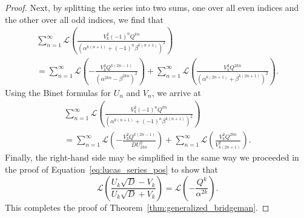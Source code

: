 \documentclass[10pt,a4paper]{amsart}
\begin{document}
\begin{proof}
    Next, by splitting the series into two sums, one over all even indices and the other over all odd indices, we find that
    \begin{multline*}
        \sum_{n=1}^{\infty}\mathcal{L}\left(\frac{V^2_k (-1)^n Q^{kn}}{\left(\alpha^{k(n+1)}+(-1)^{n}\beta^{k(n+1)}\right)^2 }\right) \\ = \sum_{n=1}^{\infty}\mathcal{L}\left(-\frac{V^2_k Q^{k(2n-1)}}{\left(\alpha^{2kn}-\beta^{2kn}\right)^2 }\right) + \sum_{n=1}^{\infty}\mathcal{L}\left(\frac{V^2_k Q^{2kn}}{\left(\alpha^{k(2n+1)}+\beta^{k(2n+1)}\right)^2 }\right).
    \end{multline*}
    Using the Binet formulas for $U_n$ and $V_n$, we arrive at
        \begin{multline*}
        \sum_{n=1}^{\infty}\mathcal{L}\left(\frac{V^2_k (-1)^n Q^{kn}}{\left(\alpha^{k(n+1)}+(-1)^{n}\beta^{k(n+1)}\right)^2 }\right) \\ = \sum_{n=1}^{\infty}\mathcal{L}\left(-\frac{V^2_k Q^{k(2n-1)}}{D U^2_{2kn} }\right) + \sum_{n=1}^{\infty}\mathcal{L}\left(\frac{V^2_k Q^{2kn}}{ V^2_{k(2n+1)}}\right).
    \end{multline*}
    Finally, the right-hand side may be simplified in the same way we proceeded in the proof of Equation~\eqref{eq:lucas_series_pos} to show that
    \begin{equation*}
        \mathcal{L}\left(\frac{U_k\sqrt{D}-V_k}{U_k\sqrt{D}+V_k}\right) = \mathcal{L}\left(-\frac{Q^k}{\alpha^{2k}}\right).
    \end{equation*}
    This completes the proof of Theorem~\ref{thm:generalized_bridgeman}.
\end{proof}
\end{document}
